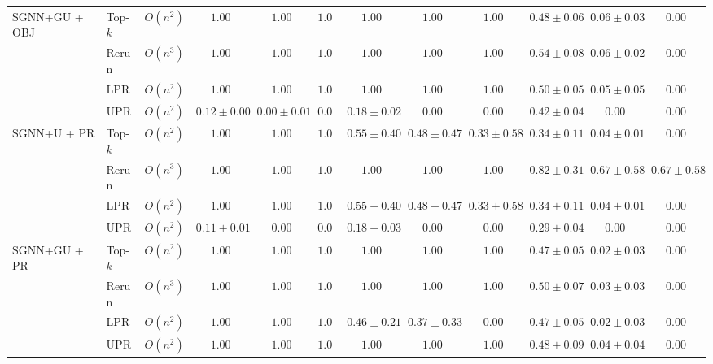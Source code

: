 \documentclass[11pt]{article}
\theoremstyle{plain}
\theoremstyle{remark}
\begin{document}
\begin{table}[t]
{\begin{tabular}{lllccccccccc}
      \midrule
      \multirow{4}{*}{SGNN+GU + OBJ}
      & Top-$k$   & $O(n^2)$ & $1.00$ & $1.00$ & $1.00$
      & $1.00$ & $1.00$ & $1.00$
      & $0.48{\pm}0.06$ & $0.06{\pm}0.03$ & $0.00$ \\
      & Rerun     & $O(n^3)$ & $1.00$ & $1.00$ & $1.00$
      & $1.00$ & $1.00$ & $1.00$
      & $0.54{\pm}0.08$ & $0.06{\pm}0.02$ & $0.00$ \\
      & LPR       & $O(n^2)$ & $1.00$ & $1.00$ & $1.00$
      & $1.00$ & $1.00$ & $1.00$
      & $0.50{\pm}0.05$ & $0.05{\pm}0.05$ & $0.00$ \\
      & UPR       & $O(n^2)$ & $0.12{\pm}0.00$ & $0.00{\pm}0.01$ & $0.00$
      & $0.18{\pm}0.02$ & $0.00$ & $0.00$
      & $0.42{\pm}0.04$ & $0.00$ & $0.00$ \\
      \midrule
      \multirow{4}{*}{SGNN+U + PR}
      & Top-$k$   & $O(n^2)$ & $1.00$ & $1.00$ & $1.00$
      & $0.55{\pm}0.40$ & $0.48{\pm}0.47$ & $0.33{\pm}0.58$
      & $0.34{\pm}0.11$ & $0.04{\pm}0.01$ & $0.00$ \\
      & Rerun     & $O(n^3)$ & $1.00$ & $1.00$ & $1.00$
      & $1.00$ & $1.00$ & $1.00$
      & $\mathbf{0.82{\pm}0.31}$ & $\mathbf{0.67{\pm}0.58}$ & $\mathbf{0.67{\pm}0.58}$ \\
      & LPR       & $O(n^2)$ & $1.00$ & $1.00$ & $1.00$
      & $0.55{\pm}0.40$ & $0.48{\pm}0.47$ & $0.33{\pm}0.58$
      & $0.34{\pm}0.11$ & $0.04{\pm}0.01$ & $0.00$ \\
      & UPR       & $O(n^2)$ & $0.11{\pm}0.01$ & $0.00$ & $0.00$
      & $0.18{\pm}0.03$ & $0.00$ & $0.00$
      & $0.29{\pm}0.04$ & $0.00$ & $0.00$ \\
      \midrule
      \multirow{4}{*}{SGNN+GU + PR}
      & Top-$k$   & $O(n^2)$ & $1.00$ & $1.00$ & $1.00$
      & $1.00$ & $1.00$ & $1.00$
      & $0.47{\pm}0.05$ & $0.02{\pm}0.03$ & $0.00$ \\
      & Rerun     & $O(n^3)$ & $1.00$ & $1.00$ & $1.00$
      & $1.00$ & $1.00$ & $1.00$
      & $0.50{\pm}0.07$ & $0.03{\pm}0.03$ & $0.00$ \\
      & LPR       & $O(n^2)$ & $1.00$ & $1.00$ & $1.00$
      & $0.46{\pm}0.21$ & $0.37{\pm}0.33$ & $0.00$
      & $0.47{\pm}0.05$ & $0.02{\pm}0.03$ & $0.00$ \\
      & UPR       & $O(n^2)$ & $\mathbf{1.00}$ & $\mathbf{1.00}$ & $\mathbf{1.00}$
      & $\mathbf{1.00}$ & $\mathbf{1.00}$ & $\mathbf{1.00}$
      & $0.48{\pm}0.09$ & $0.04{\pm}0.04$ & $0.00$ \\
      \bottomrule
    \end{tabular}%
  }
\end{table}
\end{document}
